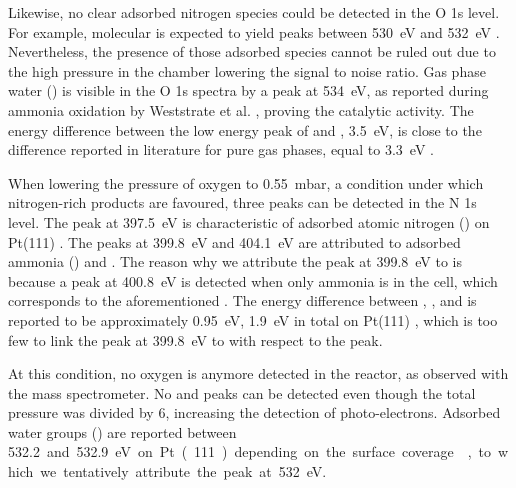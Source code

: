 Likewise, no clear adsorbed nitrogen species could be detected in the O 1s level.
For example, molecular  is expected to yield peaks between \qty{530}{\eV} and \qty{532}{\eV} \parencite{Kiskinova1984, Zhu2003, Gunther2008}.
Nevertheless, the presence of those adsorbed species cannot be ruled out due to the high pressure in the chamber lowering the signal to noise ratio.
Gas phase water () is visible in the O 1s spectra by a peak at \qty{534}{\eV}, as reported during ammonia oxidation by Weststrate et al. \parencite*{Weststrate2006}, proving the catalytic activity.
The energy difference between the low energy peak of  and , \qty{3.5}{\eV}, is close to the difference reported in literature for pure gas phases, equal to \qty{3.3}{\eV} \parencite{Linford2019, Avval2022}.


When lowering the pressure of oxygen to \qty{0.55}{\milli\bar}, a condition under which nitrogen-rich products are favoured, three peaks can be detected in the N 1s level.
The peak at \qty{397.5}{\eV} is characteristic of adsorbed atomic nitrogen () on Pt(111) \parencite{vandenBroek1999, Zhu2003}.
The peaks at \qty{399.8}{\eV} and \qty{404.1}{\eV} are attributed to adsorbed ammonia () and .
The reason why we attribute the peak at \qty{399.8}{\eV} to  is because a peak at \qty{400.8}{\eV} is detected when only ammonia is in the cell, which corresponds to the aforementioned .
The energy difference between , , and  is reported to be approximately \qty{0.95}{\eV}, \qty{1.9}{\eV} in total on Pt(111) \parencite{Ivashenko2021}, which is too few to link the peak at \qty{399.8}{\eV} to  with respect to the  peak.

At this condition, no oxygen is anymore detected in the reactor, as observed with the mass spectrometer.
No  and  peaks can be detected even though the total pressure was divided by \num{6}, increasing the detection of photo-electrons.
Adsorbed water groups () are reported between \qty{532.2} and \qty{532.9} eV on Pt(111) depending on the surface coverage \parencite{Fisher1980, Kiskinova1985}, to which we tentatively attribute the peak at \qty{532}{\eV}.

